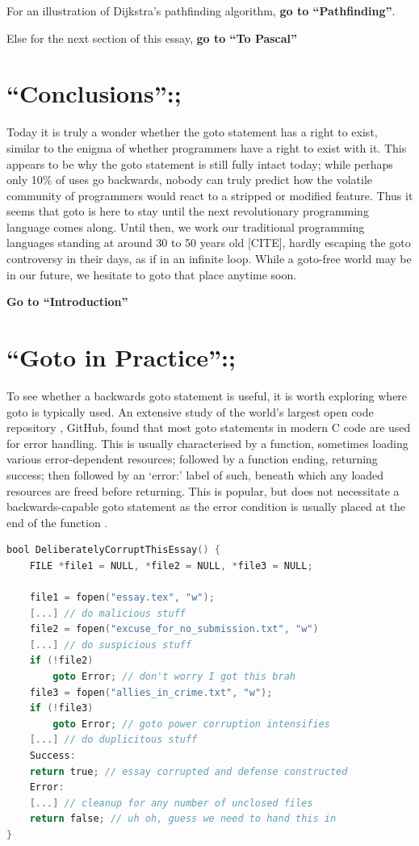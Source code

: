 \documentclass{journal}
\begin{document}
For an illustration of Dijkstra's pathfinding algorithm, \textbf{go to ``Pathfinding''}.

Else for the next section of this essay, \textbf{go to ``To Pascal''}

\setcounter{section}{4}
\section{``Conclusions'':;}
Today it is truly a wonder whether the goto statement has a right to exist, similar to the enigma of whether programmers have a right to exist with it. This appears to be why the goto statement is still fully intact today; while perhaps only 10\% of uses \cite{github} go backwards, nobody can truly predict how the volatile community of programmers would react to a stripped or modified feature. Thus it seems that goto is here to stay until the next revolutionary programming language comes along. Until then, we work our traditional programming languages standing at around 30 to 50 years old [CITE], hardly escaping the goto controversy in their days, as if in an infinite loop. While a goto-free world may be in our future, we hesitate to goto that place anytime soon.

\textbf{Go to ``Introduction''}

\setcounter{section}{3}
\section{``Goto in Practice'':;}
To see whether a backwards goto statement is useful, it is worth exploring where goto is typically used. An extensive study \cite{gotostudy} of the world's largest open code repository \cite{github}, GitHub, found that most goto statements in modern C code are used for error handling. This is usually characterised by a function, sometimes loading various error-dependent resources; followed by a function ending, returning success; then followed by an `error:' label of such, beneath which any loaded resources are freed before returning. This is popular, but does not necessitate a backwards-capable goto statement as the error condition is usually placed at the end of the function \cite{gotostudy}.

\begin{lstlisting}[language=C,caption={An example of goto used for error handling (C)}]
bool DeliberatelyCorruptThisEssay() {
	FILE *file1 = NULL, *file2 = NULL, *file3 = NULL;
	
	file1 = fopen("essay.tex", "w");
	[...] // do malicious stuff
	file2 = fopen("excuse_for_no_submission.txt", "w")
	[...] // do suspicious stuff
	if (!file2)
		goto Error; // don't worry I got this brah
	file3 = fopen("allies_in_crime.txt", "w");
	if (!file3)
		goto Error; // goto power corruption intensifies
	[...] // do duplicitous stuff
	Success:
	return true; // essay corrupted and defense constructed
	Error:
	[...] // cleanup for any number of unclosed files
	return false; // uh oh, guess we need to hand this in
}
\end{lstlisting}
\end{document}

